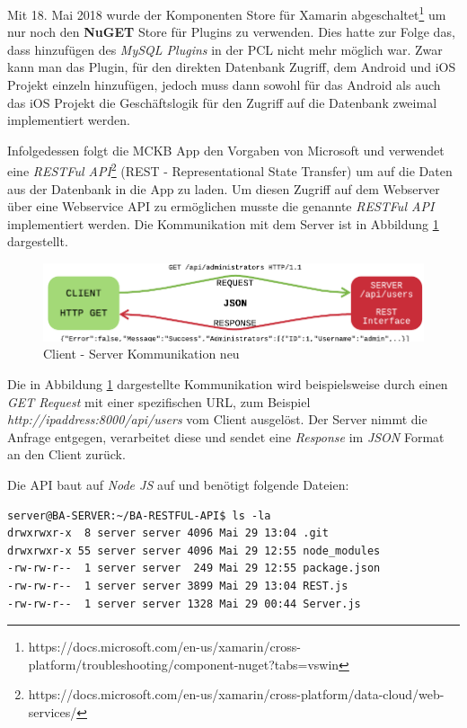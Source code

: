 	Mit 18. Mai 2018 wurde der Komponenten Store für Xamarin abgeschaltet\footnote{https://docs.microsoft.com/en-us/xamarin/cross-platform/troubleshooting/component-nuget?tabs=vswin} um nur noch den \textbf{NuGET} Store für Plugins zu verwenden. Dies hatte zur Folge das, dass hinzufügen des \textit{MySQL Plugins} in der PCL nicht mehr möglich war. Zwar kann man das Plugin, für den direkten Datenbank Zugriff, dem Android und iOS Projekt einzeln hinzufügen, jedoch muss dann sowohl für das Android als auch das iOS Projekt die Geschäftslogik für den Zugriff auf die Datenbank zweimal implementiert werden.

	Infolgedessen folgt die MCKB App den Vorgaben von Microsoft und verwendet eine \textit{RESTFul API}\footnote{https://docs.microsoft.com/en-us/xamarin/cross-platform/data-cloud/web-services/} (REST - Representational State Transfer) um auf die Daten aus der Datenbank in die App zu laden. Um diesen Zugriff auf dem Webserver über eine Webservice API zu ermöglichen musste die genannte \textit{RESTFul API} implementiert werden. Die Kommunikation mit dem Server ist in Abbildung \ref{fig:restfulcommunication} dargestellt.

	\begin{figure}[h!]
		\centering
		\includegraphics[width=1\textwidth]{images/restfull-communication.png}
		\caption{Client - Server Kommunikation neu}
		\label{fig:restfulcommunication}
	\end{figure}

	Die in Abbildung \ref{fig:restfulcommunication} dargestellte Kommunikation wird beispielsweise durch einen \textit{GET Request} mit einer spezifischen URL, zum Beispiel \textit{http://ipaddress:8000/api/users} vom Client ausgelöst. Der Server nimmt die Anfrage entgegen, verarbeitet diese und sendet eine \textit{Response} im \textit{JSON} Format an den Client zurück.

	Die API baut auf \textit{Node JS} auf und benötigt folgende Dateien:
	\begin{lstlisting}[caption={Webservice Aufbau},label={lst:restfulapi},captionpos=b,style=BashInputStyle]
server@BA-SERVER:~/BA-RESTFUL-API$ ls -la
drwxrwxr-x  8 server server 4096 Mai 29 13:04 .git
drwxrwxr-x 55 server server 4096 Mai 29 12:55 node_modules
-rw-rw-r--  1 server server  249 Mai 29 12:55 package.json
-rw-rw-r--  1 server server 3899 Mai 29 13:04 REST.js
-rw-rw-r--  1 server server 1328 Mai 29 00:44 Server.js
	\end{lstlisting}
	
